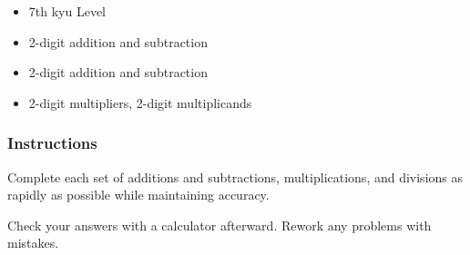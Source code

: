 \begin{itemize}
\item
  7th kyu Level
\item
  2-digit addition and subtraction
\item
  2-digit addition and subtraction
\item
  2-digit multipliers, 2-digit multiplicands
\end{itemize}

\hypertarget{instructions}{%
\subsubsection{Instructions}\label{instructions}}

Complete each set of additions and subtractions, multiplications, and
divisions as rapidly as possible while maintaining accuracy.

Check your answers with a calculator afterward. Rework any problems with
mistakes.
